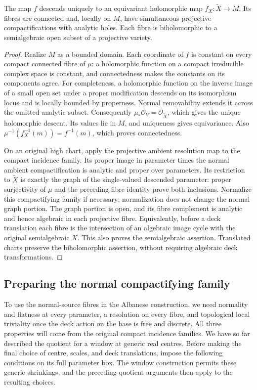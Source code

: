 \begin{lemma}\label{lem:quo-descent}
The map $f$ descends uniquely to an equivariant holomorphic map $f_X:\widetilde X\to M$. Its fibres are connected and, locally on $M$, have simultaneous projective compactifications with analytic holes. Each fibre is biholomorphic to a semialgebraic open subset of a projective variety.
\end{lemma}
\begin{proof}
Realize $M$ as a bounded domain. Each coordinate of $f$ is constant on every compact connected fibre of $\mu$: a holomorphic function on a compact irreducible complex space is constant, and connectedness makes the constants on its components agree. For completeness, a holomorphic function on the inverse image of a small open set under a proper modification descends on its isomorphism locus and is locally bounded by properness. Normal removability extends it across the omitted analytic subset. Consequently $\mu_*\mathcal{O}_V=\mathcal{O}_{\widetilde X}$, which gives the unique holomorphic descent. Its values lie in $M$, and uniqueness gives equivariance. Also $\mu^{-1}(f_X^{-1}(m))=f^{-1}(m)$, which proves connectedness.

On an original high chart, apply the projective ambient resolution map to the compact incidence family. Its proper image in parameter times the normal ambient compactification is analytic and proper over parameters. Its restriction to $\widetilde X$ is exactly the graph of the single-valued descended parameter: proper surjectivity of $\mu$ and the preceding fibre identity prove both inclusions. Normalize this compactifying family if necessary; normalization does not change the normal graph portion. The graph portion is open, and its fibre complement is analytic and hence algebraic in each projective fibre. Equivalently, before a deck translation each fibre is the intersection of an algebraic image cycle with the original semialgebraic $\widetilde X$. This also proves the semialgebraic assertion. Translated charts preserve the biholomorphic assertion, without requiring algebraic deck transformations.
\end{proof}

\subsection{Preparing the normal compactifying family}

To use the normal-source fibres in the Albanese construction, we need normality and flatness at every parameter, a resolution on every fibre, and topological local triviality once the deck action on the base is free and discrete. All three properties will come from the original compact incidence families. We have so far described the quotient for a window at generic real centres. Before making the final choice of centre, scales, and deck translations, impose the following conditions on its full parameter box. The window construction permits these generic shrinkings, and the preceding quotient arguments then apply to the resulting choices.

